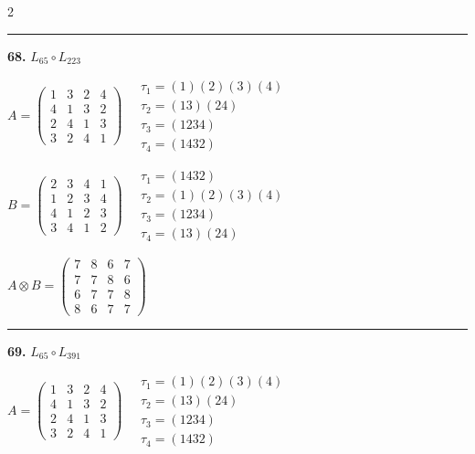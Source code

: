 \begin{multicols}{2}
\vspace{0.3em}
\hrule
\vspace{0.3em}

\noindent\textbf{68.} $L_{65} \circ L_{223}$

$A = \begin{pmatrix} 1 & 3 & 2 & 4 \\ 4 & 1 & 3 & 2 \\ 2 & 4 & 1 & 3 \\ 3 & 2 & 4 & 1 \end{pmatrix} \quad \begin{matrix} \tau_{1}=(1)(2)(3)(4) \\ \tau_{2}=(1 3)(2 4) \\ \tau_{3}=(1 2 3 4) \\ \tau_{4}=(1 4 3 2) \end{matrix}$

$B = \begin{pmatrix} 2 & 3 & 4 & 1 \\ 1 & 2 & 3 & 4 \\ 4 & 1 & 2 & 3 \\ 3 & 4 & 1 & 2 \end{pmatrix} \quad \begin{matrix} \tau_{1}=(1 4 3 2) \\ \tau_{2}=(1)(2)(3)(4) \\ \tau_{3}=(1 2 3 4) \\ \tau_{4}=(1 3)(2 4) \end{matrix}$

$A \otimes B = \begin{pmatrix} 7 & 8 & 6 & 7 \\ 7 & 7 & 8 & 6 \\ 6 & 7 & 7 & 8 \\ 8 & 6 & 7 & 7 \end{pmatrix}$

\vspace{0.3em}
\hrule
\vspace{0.3em}

\noindent\textbf{69.} $L_{65} \circ L_{391}$

$A = \begin{pmatrix} 1 & 3 & 2 & 4 \\ 4 & 1 & 3 & 2 \\ 2 & 4 & 1 & 3 \\ 3 & 2 & 4 & 1 \end{pmatrix} \quad \begin{matrix} \tau_{1}=(1)(2)(3)(4) \\ \tau_{2}=(1 3)(2 4) \\ \tau_{3}=(1 2 3 4) \\ \tau_{4}=(1 4 3 2) \end{matrix}$


\end{multicols}
